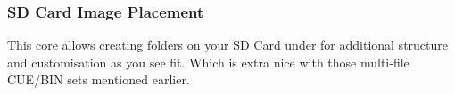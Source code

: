 \documentclass[a4paper]{article}
\begin{document}
\subsubsection{SD Card Image Placement}

This core allows creating folders on your SD Card under  for additional structure and customisation as you see fit. Which is extra nice with those multi-file CUE/BIN sets mentioned earlier.


\listoftodos[To-Do]

\printbibliography
\end{document}
